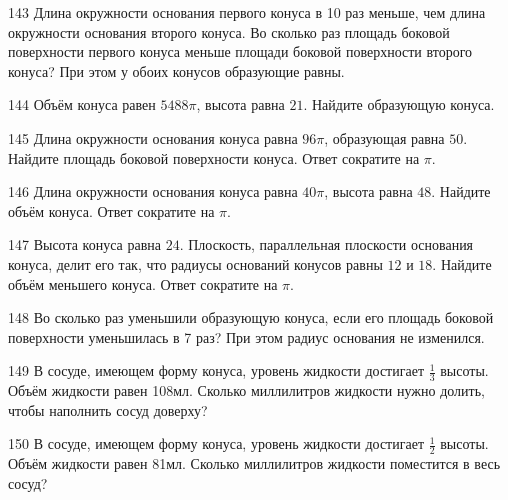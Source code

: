 \documentclass[a4paper]{article}
\begin{document}
\begin{taskBN}{143}
Длина окружности основания первого конуса в 10 раз меньше, чем длина окружности основания второго конуса. Во сколько раз площадь боковой поверхности первого конуса меньше площади боковой поверхности второго конуса? При этом у обоих конусов образующие равны.
\end{taskBN}

\begin{taskBN}{144}
Объём конуса равен $5488\pi$, высота равна $21$. Найдите образующую конуса. 
\end{taskBN}

\begin{taskBN}{145}
Длина окружности основания конуса равна $96\pi$, образующая равна $50$. Найдите площадь боковой поверхности конуса. Ответ сократите на $\pi$.
\end{taskBN}

\begin{taskBN}{146}
Длина окружности основания конуса равна $40\pi$, высота равна $48$. Найдите объём конуса. Ответ сократите на $\pi$.
\end{taskBN}

\begin{taskBN}{147}
Высота конуса равна $24$. Плоскость, параллельная плоскости основания конуса,  делит его так, что радиусы оснований конусов равны $12$ и $18$. Найдите объём меньшего конуса. Ответ сократите на $\pi$.
\end{taskBN}

\begin{taskBN}{148}
Во сколько раз уменьшили образующую конуса, если его площадь боковой поверхности уменьшилась в 7 раз? При этом радиус основания не изменился.
\end{taskBN}

\begin{taskBN}{149}
В сосуде, имеющем форму конуса, уровень жидкости достигает $\frac{1}{3}$ высоты. Объём жидкости равен 108мл. Сколько миллилитров жидкости нужно долить, чтобы наполнить сосуд доверху?
\end{taskBN}

\begin{taskBN}{150}
В сосуде, имеющем форму конуса, уровень жидкости достигает $\frac{1}{2}$ высоты. Объём жидкости равен 81мл. Сколько миллилитров жидкости поместится в весь сосуд?
\end{taskBN}
\end{document}
